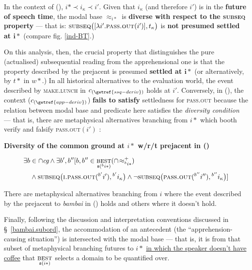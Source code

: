 \xe


In the context of (), $ i*\prec i_\kappa\prec i' $. Given that $ i_\kappa $ (and therefore $ i' $) is in the \textbf{future of speech time}, the modal base $ \approx_{i*} $ is \textbf{diverse with respect to the \textsc{subseq} property} --- that is: $ \textsc{subseq}\big([\lambda i'.\textsc{pass.out}(i')],t_\kappa\big) $ is \textbf{not presumed settled at $ \boldsymbol{i*} $} (compare fig. \ref{ind-BT}.)


On this analysis, then, the crucial property that distinguishes the pure (actualised) subsequential reading from the apprehensional one is that the property described by the prejacent is presumed \textbf{settled at $ \boldsymbol{i*}$} (or alternatively, by $ t* $ in $ w* $.) In all historical alternatives to the evaluation world, the event described by \textsc{make.lunch} in $ c_{(\getref{ssq-deriv})}$ holds at $ i' $. Conversely, in (), the context ($ c_{(\getref{app-deriv})} $) \textbf{fails to satisfy} settledness for \textsc{pass.out} because the relation between modal base and predicate here satisfies the \textit{diversity condition} --- that is, there are metaphysical alternatives branching from $ i* $ which booth verify and falsify \textsc{pass.out}$ (i') $ \citep[\textit{cf.}][83]{Condoravdi2002}:

\pex \textbf{Diversity of the common ground at $ i* $ w/r/t prejacent in ()}


$$ \begin{multlined}\exists b\in\cap\textit{cg}\wedge\exists b',b''[b,b''\in\underset{\mathfrak s(^bi*)}{\textsc{best}}(\cap\!\approx^+_{^bi*})\\\wedge\textsc{subseq}\big(\textsc{i.pass.out}(^{b'}i'),{}^{b'}i_\kappa\big)\wedge\neg\textsc{subseq}\big(\textsc{pass.out}(^{b''}i''),{}^{b''}i_\kappa\big)]\end{multlined}$$ 

There are metaphysical alternatives branching from $ i $ where the event described by the prejacent to \textit{bambai} in () holds and others where it doesn't hold.
\xe

\noindent Finally, following the discussion and interpretation conventions discussed in \S~\ref{bambai.subord}, the accommodation of an antecedent (the ``apprehension-causing situation'') is intersected with the modal base --- that is, it is from that subset of metaphysical branching futures to $ i* $ \ul{in which the speaker doesn't have coffee} that $ \underset{\mathfrak s(i*)}{\textsc{best}} $ selects a domain to be quantified over.%

